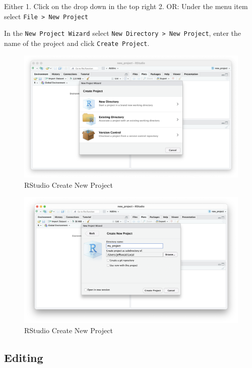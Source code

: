 \documentclass[
]{book}
\begin{document}
Either 1. Click on the drop down in the top right 2. OR: Under the menu item select \texttt{File\ \textgreater{}\ New\ Project}

In the \texttt{New\ Project\ Wizard} select \texttt{New\ Directory\ \textgreater{}\ New\ Project}, enter the name of the project and click \texttt{Create\ Project}.

\begin{figure}
\includegraphics[width=30.72in]{images/03_021_new_project_01} \caption{\label{fig:3201}RStudio Create New Project}\label{fig:3201}
\end{figure}
\begin{figure}
\includegraphics[width=31.94in]{images/03_021_new_project_02} \caption{\label{fig:3202}RStudio Create New Project}\label{fig:3202}
\end{figure}

\hypertarget{editing}{%
\subsection{Editing}\label{editing}}
\end{document}

